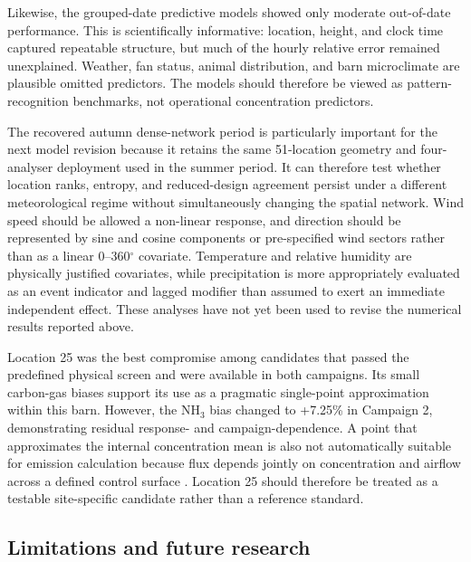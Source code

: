 \documentclass[12pt,a4paper]{article}
\begin{document}
Likewise, the grouped-date predictive models showed only moderate out-of-date
performance. This is scientifically informative: location, height, and clock
time captured repeatable structure, but much of the hourly relative error
remained unexplained. Weather, fan status, animal distribution, and barn
microclimate are plausible omitted predictors. The models should therefore be
viewed as pattern-recognition benchmarks, not operational concentration
predictors.

The recovered autumn dense-network period is particularly important for the
next model revision because it retains the same 51-location geometry and
four-analyser deployment used in the summer period. It can therefore test
whether location ranks, entropy, and reduced-design agreement persist under a
different meteorological regime without simultaneously changing the spatial
network. Wind speed should be allowed a non-linear response, and direction
should be represented by sine and cosine components or pre-specified wind
sectors rather than as a linear 0--360\(^\circ\) covariate. Temperature and
relative humidity are physically justified covariates, while precipitation is
more appropriately evaluated as an event indicator and lagged modifier than
assumed to exert an immediate independent effect. These analyses have not yet
been used to revise the numerical results reported above.

Location 25 was the best compromise among candidates that passed the
predefined physical screen and were available in both campaigns. Its small
carbon-gas biases support its use as a pragmatic single-point approximation
within this barn. However, the \(\mathrm{NH_3}\) bias changed to +7.25\% in
Campaign 2, demonstrating residual response- and campaign-dependence. A point
that approximates the internal concentration mean is also not automatically
suitable for emission calculation because flux depends jointly on
concentration and airflow across a defined control surface
\citep{Calvet2013,Ogink2013}. Location 25 should therefore be treated as a
testable site-specific candidate rather than a reference standard.

\subsection{Limitations and future research}
\end{document}
